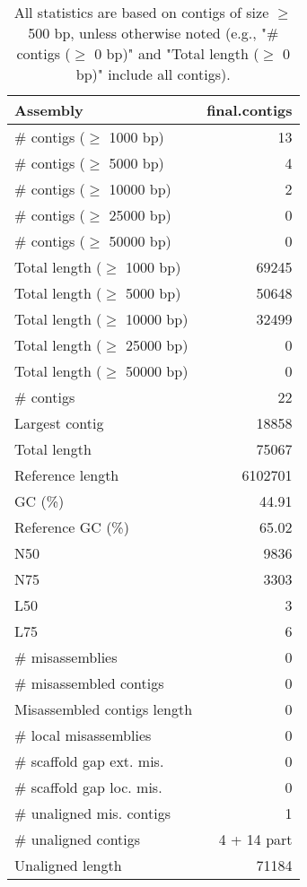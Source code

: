 \documentclass[12pt,a4paper]{article}
\begin{document}
\begin{table}[ht]
\begin{center}
\caption{All statistics are based on contigs of size $\geq$ 500 bp, unless otherwise noted (e.g., "\# contigs ($\geq$ 0 bp)" and "Total length ($\geq$ 0 bp)" include all contigs).}
\begin{tabular}{|l*{1}{|r}|}
\hline
Assembly & final.contigs \\ \hline
\# contigs ($\geq$ 1000 bp) & 13 \\ \hline
\# contigs ($\geq$ 5000 bp) & 4 \\ \hline
\# contigs ($\geq$ 10000 bp) & 2 \\ \hline
\# contigs ($\geq$ 25000 bp) & 0 \\ \hline
\# contigs ($\geq$ 50000 bp) & 0 \\ \hline
Total length ($\geq$ 1000 bp) & 69245 \\ \hline
Total length ($\geq$ 5000 bp) & 50648 \\ \hline
Total length ($\geq$ 10000 bp) & 32499 \\ \hline
Total length ($\geq$ 25000 bp) & 0 \\ \hline
Total length ($\geq$ 50000 bp) & 0 \\ \hline
\# contigs & 22 \\ \hline
Largest contig & 18858 \\ \hline
Total length & 75067 \\ \hline
Reference length & 6102701 \\ \hline
GC (\%) & 44.91 \\ \hline
Reference GC (\%) & 65.02 \\ \hline
N50 & 9836 \\ \hline
N75 & 3303 \\ \hline
L50 & 3 \\ \hline
L75 & 6 \\ \hline
\# misassemblies & 0 \\ \hline
\# misassembled contigs & 0 \\ \hline
Misassembled contigs length & 0 \\ \hline
\# local misassemblies & 0 \\ \hline
\# scaffold gap ext. mis. & 0 \\ \hline
\# scaffold gap loc. mis. & 0 \\ \hline
\# unaligned mis. contigs & 1 \\ \hline
\# unaligned contigs & 4 + 14 part \\ \hline
Unaligned length & 71184 \\ \hline

\end{tabular}
\end{center}
\end{table}
\end{document}
